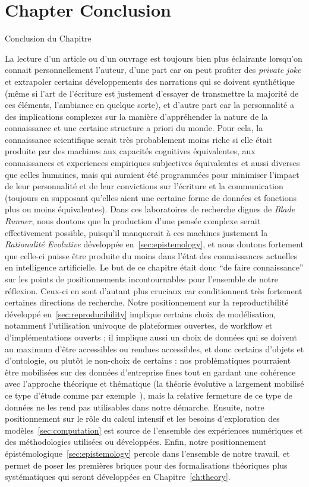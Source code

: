 


\newpage


\section*{Chapter Conclusion}{Conclusion du Chapitre}


La lecture d'un article ou d'un ouvrage est toujours bien plus éclairante lorsqu'on connait personnellement l'auteur, d'une part car on peut profiter des \emph{private joke} et extrapoler certains développements des narrations qui se doivent synthétique (même si l'art de l'écriture est justement d'essayer de transmettre la majorité de ces éléments, l'ambiance en quelque sorte), et d'autre part car la personnalité a des implications complexes sur la manière d'appréhender la nature de la connaissance et une certaine structure a priori du monde. Pour cela, la connaissance scientifique serait très probablement moins riche si elle était produite par des machines aux capacités cognitives équivalentes, aux connaissances et experiences empiriques subjectives équivalentes et aussi diverses que celles humaines, mais qui auraient été programmées pour minimiser l'impact de leur personnalité et de leur convictions sur l'écriture et la communication (toujours en supposant qu'elles aient une certaine forme de données et fonctions plus ou moins équivalentes). Dans ces laboratoires de recherche dignes de \emph{Blade Runner}, nous doutons que la production d'une pensée complexe serait effectivement possible, puisqu'il manquerait à ces machines justement la \emph{Rationalité Evolutive} développée en~\ref{sec:epistemology}, et nous doutons fortement que celle-ci puisse être produite du moins dans l'état des connaissances actuelles en intelligence artificielle. Le but de ce chapitre était donc ``de faire connaissance'' sur les points de positionnements incontournables pour l'ensemble de notre réflexion. Ceux-ci en sont d'autant plus cruciaux car conditionnent très fortement certaines directions de recherche. Notre positionnement sur la reproductibilité développé en~\ref{sec:reproducibility} implique certains choix de modélisation, notamment l'utilisation univoque de plateformes ouvertes, de workflow et d'implémentations ouverts ; il implique aussi un choix de données qui se doivent au maximum d'être accessibles ou rendues accessibles, et donc certains d'objets et d'ontologie, ou plutôt le non-choix de certains : nos problématiques pourraient être mobilisées sur des données d'entreprise fines tout en gardant une cohérence avec l'approche théorique et thématique (la théorie évolutive a largement mobilisé ce type d'étude comme par exemple~\cite{paulus2004coevolution}), mais la relative fermeture de ce type de données ne les rend pas utilisables dans notre démarche. Ensuite, notre positionnement sur le rôle du calcul intensif et les besoins d'exploration des modèles~\ref{sec:computation} est source de l'ensemble des expériences numériques et des méthodologies utilisées ou développées. Enfin, notre positionnement épistémologique~\ref{sec:epistemology} percole dans l'ensemble de notre travail, et permet de poser les premières briques pour des formalisations théoriques plus systématiques qui seront développées en Chapitre~\ref{ch:theory}.


